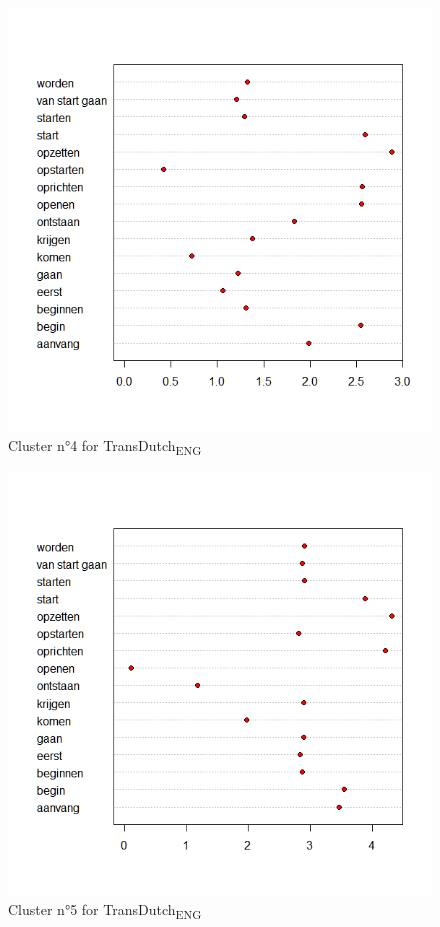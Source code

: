 \begin{figure}
\includegraphics[height=.4\textheight]{figures/Vandevoorde2-img72.png}
\caption{\label{fig:4:70}  Cluster n°4 for TransDutch\textsubscript{ENG}}
\end{figure}

\begin{figure}
\includegraphics[height=.4\textheight]{figures/Vandevoorde2-img73.png}
\caption{\label{fig:4:71}  Cluster n°5 for TransDutch\textsubscript{ENG}}
\end{figure}

